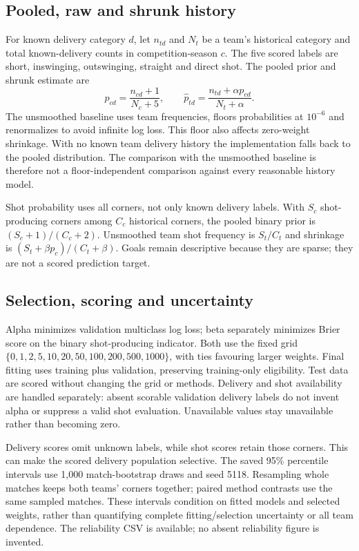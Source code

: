 \documentclass[sigconf,nonacm]{acmart}
\begin{document}
\subsection{Pooled, raw and shrunk history}
For known delivery category $d$, let $n_{td}$ and $N_t$ be a team's historical
category and total known-delivery counts in competition-season $c$. The five
scored labels are short, inswinging, outswinging, straight and direct shot.
The pooled prior and shrunk estimate are
\begin{equation}
 p_{cd}=\frac{n_{cd}+1}{N_c+5},\qquad
 \widehat p_{td}=\frac{n_{td}+\alpha p_{cd}}{N_t+\alpha}.
\end{equation}
The unsmoothed baseline uses team frequencies, floors probabilities at $10^{-6}$
and renormalizes to avoid infinite log loss. This floor also affects zero-weight
shrinkage. With no known team delivery history the implementation falls back to
the pooled distribution. The comparison with the unsmoothed baseline is therefore
not a floor-independent comparison against every reasonable history model.

Shot probability uses all corners, not only known delivery labels. With $S_c$
shot-producing corners among $C_c$ historical corners, the pooled binary prior is
$(S_c+1)/(C_c+2)$. Unsmoothed team shot frequency is $S_t/C_t$ and shrinkage is
$(S_t+\beta p_c)/(C_t+\beta)$. Goals remain descriptive because they are sparse;
they are not a scored prediction target.

\subsection{Selection, scoring and uncertainty}
Alpha minimizes validation multiclass log loss; beta separately minimizes Brier
score on the binary shot-producing indicator. Both use the fixed grid
$\{0,1,2,5,10,20,50,100,200,500,1000\}$, with ties favouring larger weights.
Final fitting uses training plus validation, preserving training-only eligibility.
Test data are scored without changing the grid or methods. Delivery and shot
availability are handled separately: absent scorable validation delivery labels
do not invent alpha or suppress a valid shot evaluation. Unavailable values stay
unavailable rather than becoming zero.

Delivery scores omit unknown labels, while shot scores retain those corners.
This can make the scored delivery population selective. The saved 95\% percentile
intervals use 1,000 match-bootstrap draws and seed 5118. Resampling whole matches
keeps both teams' corners together; paired method contrasts use the same sampled
matches. These intervals condition on fitted models and selected weights, rather
than quantifying complete fitting/selection uncertainty or all team dependence.
The reliability CSV is available; no absent reliability figure is invented.
\end{document}

